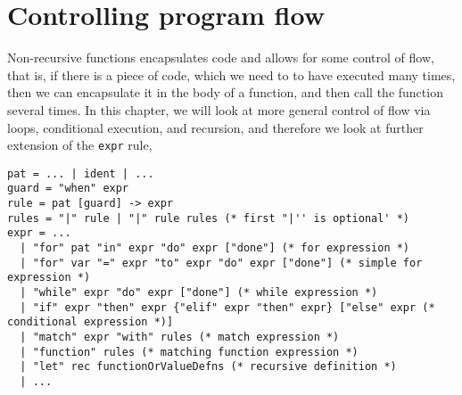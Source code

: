 \chapter{Controlling program flow}
\label{chap:flow}
Non-recursive functions encapsulates code and allows for some control of flow, that is, if there is a piece of code, which we need to to have executed many times, then we can encapsulate it in the body of a function, and then call the function several times. In this chapter, we will look at more general control of flow via loops, conditional execution, and recursion, and therefore we look at further extension of the \lstinline[language=ebnf]!expr! rule,
\begin{lstlisting}[language=ebnf]
pat = ... | ident | ...
guard = "when" expr
rule = pat [guard] -> expr
rules = "|" rule | "|" rule rules (* first "|'' is optional' *)
expr = ... 
  | "for" pat "in" expr "do" expr ["done"] (* for expression *)
  | "for" var "=" expr "to" expr "do" expr ["done"] (* simple for expression *)
  | "while" expr "do" expr ["done"] (* while expression *)
  | "if" expr "then" expr {"elif" expr "then" expr} ["else" expr (*  conditional expression *)]
  | "match" expr "with" rules (* match expression *)
  | "function" rules (* matching function expression *)
  | "let" rec functionOrValueDefns (* recursive definition *)
  | ...
\end{lstlisting}

